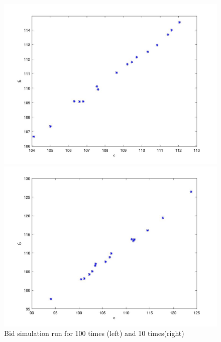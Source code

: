 \documentclass[11pt]{article}
\begin{document}
\begin{figure}
\centering
    \begin{minipage}[h]{0.5\textwidth}
        \centering 
        \includegraphics[width=\linewidth]{100run.jpg}
    \end{minipage}%
    \begin{minipage}[h]{0.5\textwidth}
        \centering
        \includegraphics[width=\linewidth]{10run.jpg}
    \end{minipage}
\caption{Bid simulation run for 100 times (left) and 10 times(right)}
\label{fig:simulation_run_times}
\end{figure}
\end{document}

